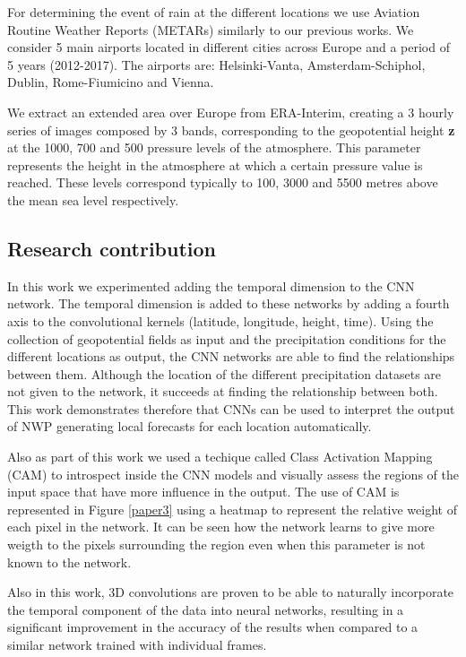 For determining the event of rain at the different locations we use Aviation Routine Weather Reports (METARs) similarly to our previous works. We consider 5 main airports located in different cities across Europe and a period of 5 years (2012-2017). The airports are: Helsinki-Vanta, Amsterdam-Schiphol, Dublin, Rome-Fiumicino and Vienna.

We extract an extended area over Europe from ERA-Interim, creating a 3 hourly series of images composed by 3 bands, corresponding to the geopotential height \textbf{z} at the 1000, 700 and 500 pressure levels of the atmosphere. This parameter represents the height in the atmosphere at which a certain pressure value is reached. These levels correspond typically to 100, 3000 and 5500 metres above the mean sea level respectively.

\subsection{Research contribution}

In this work we experimented adding the temporal dimension to the CNN network. The temporal dimension is added to these networks by adding a fourth axis to the convolutional kernels (latitude, longitude, height, time). Using the collection of geopotential fields as input and the precipitation conditions for the different locations as output, the CNN networks are able to find the relationships between them. Although the location of the different precipitation datasets are not given to the network, it succeeds at finding the relationship between both. This work demonstrates therefore that CNNs can be used to interpret the output of NWP generating local forecasts for each location automatically.

Also as part of this work we used a techique called Class Activation Mapping (CAM) \citep{zhou2016learning} to introspect inside the CNN models and visually assess the regions of the input space that have more influence in the output. The use of CAM is represented in Figure \ref{paper3} using a heatmap to represent the relative weight of each pixel in the network. It can be seen how the network learns to give more weigth to the pixels surrounding the region even when this parameter is not known to the network.

Also in this work, 3D convolutions are proven to be able to naturally incorporate the temporal component of the data into neural networks, resulting in a significant improvement in the accuracy of the results when compared to a similar network trained with individual frames.

